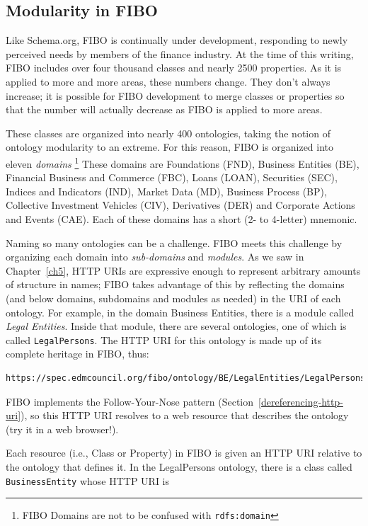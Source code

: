 \subsection{Modularity in FIBO}

Like Schema.org, FIBO is continually under development, responding to newly perceived needs by members of the 
finance industry.  At the time of this writing, FIBO includes over four thousand classes and nearly 2500 properties. As 
it is applied to more and more areas, these numbers change. They don't always increase; it is possible for FIBO development to 
merge classes or properties so that the number will actually decrease as FIBO is applied to more areas. 

These classes are organized into nearly 400 ontologies, taking the notion of ontology modularity to an extreme.  
For this reason, FIBO is organized into eleven \emph{domains} \footnote{FIBO Domains are not to be confused with \texttt{rdfs:domain}}
These domains are Foundations (FND), Business Entities (BE), Financial Business and Commerce (FBC), Loans (LOAN), Securities (SEC), 
Indices and Indicators (IND), Market Data (MD), Business Process (BP), Collective Investment Vehicles (CIV), Derivatives (DER) and 
Corporate Actions and Events (CAE).   Each of these domains has a short (2- to 4-letter) mnemonic. 

Naming so many ontologies can be a challenge.  FIBO meets this challenge by organizing each domain 
into \emph{sub-domains} and \emph{modules}. 
As we saw in Chapter~\ref{ch5}, HTTP URIs are expressive enough to represent arbitrary amounts of structure in names; 
FIBO takes advantage of this by reflecting the domains (and below domains, subdomains and modules as needed) in the URI 
of each ontology.  For example, in the domain Business Entities, there is a module called \emph{Legal Entities}.  Inside that 
module, there are several ontologies, one of which is called \texttt{LegalPersons}.  The HTTP URI for this ontology
is made up of its complete heritage in FIBO, thus:

\begin{lstlisting}
https://spec.edmcouncil.org/fibo/ontology/BE/LegalEntities/LegalPersons/
\end{lstlisting}

FIBO implements the Follow-Your-Nose pattern (Section~\ref{dereferencing-http-uri}), so this HTTP URI resolves to 
a web resource that describes the ontology (try it in a web browser!). 

Each resource (i.e., Class or Property) in FIBO is given an HTTP URI relative to the ontology that defines it.  In the LegalPersons 
ontology, there is a class called \texttt{BusinessEntity} whose HTTP URI is 

